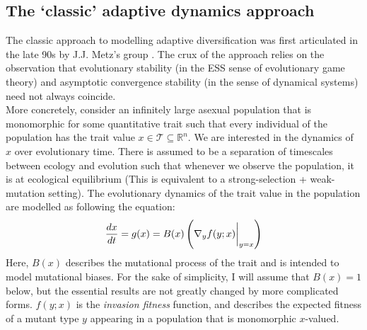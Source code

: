 \subsection{The `classic' adaptive dynamics approach}
The classic approach to modelling adaptive diversification was first articulated in the late 90s by J.J. Metz's group \citep{geritz_evolutionarily_1998}. The crux of the approach relies on the observation that evolutionary stability (in the ESS sense of evolutionary game theory) and asymptotic convergence stability (in the sense of dynamical systems) need not always coincide.\\
More concretely, consider an infinitely large asexual population that is monomorphic for some quantitative trait such that every individual of the population has the trait value $x \in \mathcal{T} \subseteq \mathbb{R}^n$. We are interested in the dynamics of $x$ over evolutionary time. There is assumed to be a separation of timescales between ecology and evolution such that whenever we observe the population, it is at ecological equilibrium (This is equivalent to a strong-selection + weak-mutation setting). The evolutionary dynamics of the trait value in the population are modelled as following the equation:
\begin{equation}
\label{AD_canonical_eqn}
\frac{dx}{dt} = g(x) = B(x)\left(\nabla_y f(y;x) \bigg{|}_{y=x}\right)
\end{equation}
Here, $B(x)$ describes the mutational process of the trait and is intended to model mutational biases. For the sake of simplicity, I will assume that $B(x) = 1$ below, but the essential results are not greatly changed by more complicated forms. $f(y;x)$ is the \emph{invasion fitness} function, and describes the expected fitness of a mutant type $y$ appearing in a population that is monomorphic $x$-valued.%
